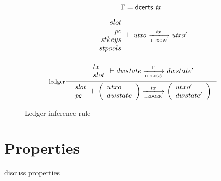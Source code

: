 \documentclass[11pt,a4paper]{article}
\newcommand{\dcerts}[1]{\fun{dcerts}~ \var{#1}}
\theoremstyle{definition}
\theoremstyle{definition}
\begin{document}
\begin{figure}
  \begin{equation}
    \label{eq:ledger}
    \inference[ledger]
    {
      \Gamma = \dcerts{tx} \\ ~ \\
      {
        \begin{array}{r}
        slot\\
        pc\\
        stkeys\\
        stpools\\
        \end{array}
      }
      \vdash \var{utxo} \trans{utxow}{tx} \var{utxo'}\\~\\~\\
      {
        \begin{array}{l}
          tx \\
          slot \\
        \end{array}
      }
      \vdash
      dwstate \trans{delegs}{\Gamma} dwstate'
    }
    {
      \begin{array}{l}
        \var{slot}\\
        \var{pc}\\
      \end{array}
      \vdash
      \left(
        \begin{array}{ll}
          utxo \\
          dwstate \\
        \end{array}
      \right)
      \trans{ledger}{tx}
      \left(
        \begin{array}{ll}
          utxo' \\
          dwstate' \\
        \end{array}
      \right)
    }
  \end{equation}
  \caption{Ledger inference rule}
  \label{fig:rules:ledger}
\end{figure}

\section{Properties}
\label{sec:properties}

\begin{todo}
  discuss properties
\end{todo}





\end{document}
